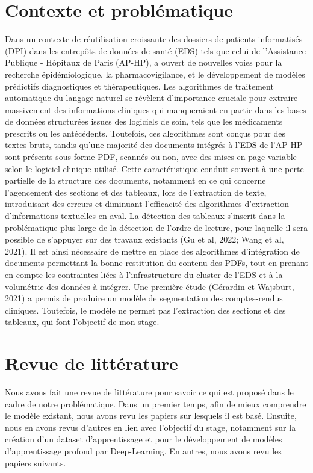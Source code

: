 \documentclass{report}
\begin{document}
\begin{multicols}{2}
    \section{Contexte et problématique} 
    Dans un contexte de réutilisation croissante des dossiers de patients informatisés (DPI) dans les entrepôts de données de santé (EDS) tels que celui de l’Assistance Publique - Hôpitaux de Paris (AP-HP), a  ouvert de nouvelles voies pour la recherche épidémiologique, la pharmacovigilance, et le développement de modèles prédictifs diagnostiques et thérapeutiques. Les algorithmes de traitement automatique du langage naturel se révèlent d’importance cruciale pour extraire massivement des informations cliniques qui manqueraient en partie dans les bases de données structurées issues des logiciels de soin, tels que les médicaments prescrits ou les antécédents.
    \hspace{0.1em} Toutefois, ces algorithmes sont conçus pour des textes bruts, tandis qu’une majorité des documents intégrés à l’EDS de l’AP-HP sont présents sous forme PDF, scannés ou non, avec des mises en page variable selon le logiciel clinique utilisé. Cette caractéristique conduit souvent à une perte partielle  de la structure des documents, notamment en ce qui concerne l’agencement des sections et des tableaux, lors de l’extraction de texte, introduisant des erreurs et diminuant l’efficacité des algorithmes d’extraction d’informations textuelles en aval. La détection des tableaux s’inscrit dans la problématique plus large de la détection de l’ordre de lecture, pour laquelle il sera possible de s’appuyer sur des travaux existants (Gu et al, 2022; Wang et al, 2021). Il est ainsi nécessaire de mettre en place des algorithmes d’intégration de documents permettant la bonne restitution du contenu des PDFs, tout en prenant en compte les contraintes liées à l’infrastructure du cluster de l’EDS et à la volumétrie des données à intégrer. Une première étude (Gérardin et Wajsbürt, 2021) a permis de produire un modèle de segmentation des comptes-rendus cliniques. Toutefois, le modèle ne permet pas l’extraction des sections et des tableaux, qui font l’objectif de mon stage.

    \section{Revue de littérature}
    Nous avons fait une revue de littérature pour savoir ce qui est proposé dans le cadre de notre problématique. Dans un premier temps, afin de mieux comprendre le modèle existant, nous avons revu les papiers sur lesquels il est basé. Ensuite, nous en avons revus d’autres en lien avec l’objectif du stage, notamment sur la création d’un dataset d’apprentissage et pour le développement de modèles d’apprentissage profond par Deep-Learning. En autres, nous avons revu les papiers suivants.


\end{multicols}
\end{document}
